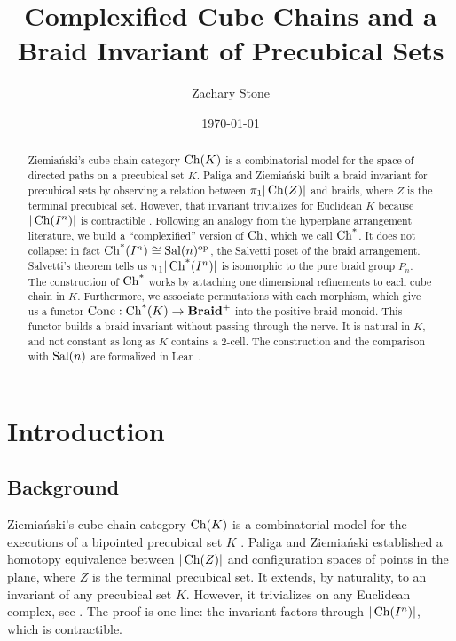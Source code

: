 \documentclass[11pt]{article}
\title{Complexified Cube Chains and a Braid Invariant of Precubical Sets}
\author{Zachary Stone}
\date{\today}
\begin{document}
\maketitle

\begin{abstract}
Ziemiański's cube chain category $\operatorname{Ch}(K)$ is a combinatorial model for the space of directed paths
on a precubical set $K$. Paliga and Ziemiański built a braid invariant for precubical sets 
by observing a relation between $\pi_1|\operatorname{Ch}(Z)|$ and braids, where $Z$ is the terminal precubical set.
However, that invariant trivializes for Euclidean $K$ because $|\operatorname{Ch}(I^{n})|$ is
contractible \cite[Prop.~6.1]{PZ}.
Following an analogy from the hyperplane arrangement literature, we build a ``complexified''
version of $\operatorname{Ch}$, which we call $\operatorname{Ch^*}$. It does not collapse: in fact
$\operatorname{Ch^*}(I^{n}) \cong \operatorname{Sal}(n)^{\mathrm{op}}$, the Salvetti poset of the braid arrangement. Salvetti's
theorem tells us $\pi_1|\operatorname{Ch^*}(I^{n})|$ is isomorphic to the pure braid group $P_n$.
The construction of $\operatorname{Ch^*}$ works by attaching one dimensional refinements to each 
cube chain in $K$. Furthermore, we associate permutations with each morphism, which give us a 
functor $\operatorname{Conc} : \operatorname{Ch^*}(K) \to \mathbf{Braid}^{+}$ into the positive braid monoid.
This functor builds a braid invariant without passing through the nerve.
It is natural in $K$, and not constant as long as $K$ contains a 2-cell.
The construction and the comparison with $\operatorname{Sal}(n)$ are formalized in Lean \cite{Cubical}.
\end{abstract}

\tableofcontents
\bigskip

\section{Introduction}\label{sec:intro}
\subsection{Background}

Ziemiański's cube chain category $\operatorname{Ch}(K)$ is a combinatorial model for the executions of a
bipointed precubical set $K$ \cite[Thm.~7.6]{Z2}. Paliga and Ziemiański established a homotopy 
equivalence between $|\operatorname{Ch}(Z)|$ and configuration spaces of points in the plane, 
where $Z$ is the terminal precubical set.
It extends, by naturality, to an invariant of any precubical set $K$.
However, it trivializes on any Euclidean complex, see {\cite[Prop.~6.1]{PZ}}. 
The proof is one line: the invariant factors through $|\operatorname{Ch}(I^{n})|$, which is contractible.
\end{document}

